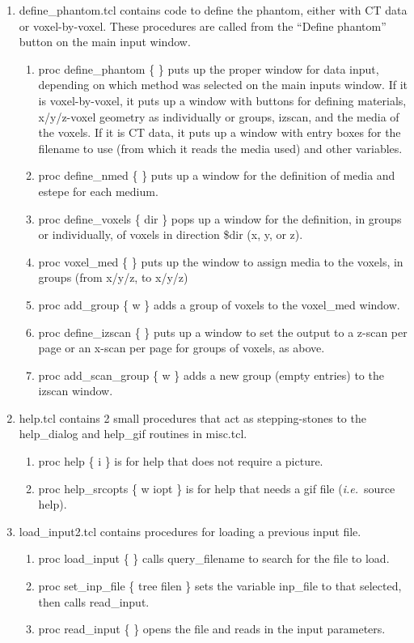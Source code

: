 \documentclass[12pt]{book}
\newcommand{\ie}{{\em i.e.}}
\begin{document}
\begin{enumerate}
\item define\_phantom.tcl contains code to define the phantom, either
with CT data or voxel-by-voxel.  These procedures are called from the
``Define phantom'' button on the main input window.
\begin{enumerate}
\item proc define\_phantom \{ \} puts up the proper window for data
input, depending on which method was selected on the main inputs
window.  If it is voxel-by-voxel, it puts up a window with buttons for
defining materials, x/y/z-voxel geometry as individually or groups,
izscan, and the media of the voxels.  If it is CT data, it puts up a
window with entry boxes for the filename to use (from which it reads the
media used) and other variables.
\item proc define\_nmed \{ \} puts up a window for the definition of
media and estepe for each medium.
\item proc define\_voxels \{ dir \} pops up a window for the definition,
in groups or individually, of voxels in direction \$dir (x, y, or z).
\item proc voxel\_med \{ \} puts up the window to assign media to the
voxels, in groups (from x/y/z, to x/y/z)
\item proc add\_group \{ w \} adds a group of voxels to the voxel\_med window.
\item proc define\_izscan \{ \} puts up a window to set the output to a
z-scan per page or an x-scan per page for groups of voxels, as above.
\item proc add\_scan\_group \{ w \} adds a new group (empty entries) to
the izscan window.
\end{enumerate}

\item help.tcl contains 2 small procedures that act as stepping-stones
to the help\_dialog and help\_gif routines in misc.tcl.
\begin{enumerate}
\item proc help \{ i \} is for help that does not require a picture.
\item proc help\_srcopts \{ w iopt \} is for help that needs a gif file
(\ie~source help).
\end{enumerate}

\item load\_input2.tcl contains procedures for loading a previous input file.
\begin{enumerate}
\item proc load\_input \{ \} calls query\_filename to search for the
file to load.
\item proc set\_inp\_file \{ tree filen \} sets the variable inp\_file
to that selected, then calls read\_input.
\item proc read\_input \{ \} opens the file and reads in the input parameters.
\end{enumerate}


\end{enumerate}
\end{document}
